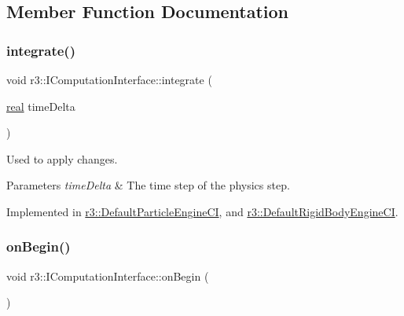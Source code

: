 \subsection{Member Function Documentation}
\mbox{\label{classr3_1_1_i_computation_interface_a162250f2b6efbd85460bd0f780d42cff}} 
\subsubsection{\texorpdfstring{integrate()}{integrate()}}
{\footnotesize\ttfamily void r3\+::\+I\+Computation\+Interface\+::integrate (\begin{DoxyParamCaption}\item[{\mbox{\hyperlink{namespacer3_ab2016b3e3f743fb735afce242f0dc1eb}{real}}}]{time\+Delta }\end{DoxyParamCaption})\hspace{0.3cm}{\ttfamily [pure virtual]}}



Used to apply changes. 


\begin{DoxyParams}{Parameters}
{\em time\+Delta} & The time step of the physics step. \\
\hline
\end{DoxyParams}


Implemented in \mbox{\hyperlink{classr3_1_1_default_particle_engine_c_i_a4603707afe6c841a83294a46ea4a1c62}{r3\+::\+Default\+Particle\+Engine\+CI}}, and \mbox{\hyperlink{classr3_1_1_default_rigid_body_engine_c_i_a4b79e7e4bc76eedcad7ef5c4777b9d33}{r3\+::\+Default\+Rigid\+Body\+Engine\+CI}}.

\mbox{\label{classr3_1_1_i_computation_interface_a430ebc9cb8d4ba064ac6a032ef07edd7}} 
\subsubsection{\texorpdfstring{on\+Begin()}{onBegin()}}
{\footnotesize\ttfamily void r3\+::\+I\+Computation\+Interface\+::on\+Begin (\begin{DoxyParamCaption}{ }\end{DoxyParamCaption})\hspace{0.3cm}{\ttfamily [pure virtual]}}



